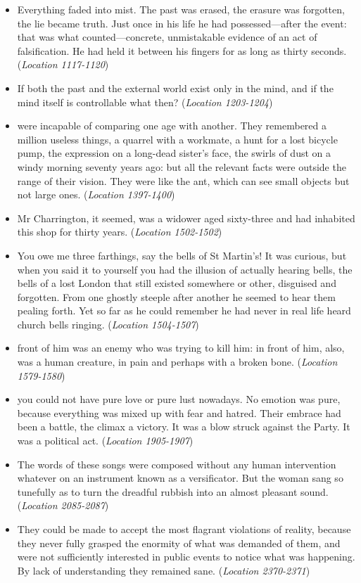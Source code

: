 \documentclass[12pt]{article}
\begin{document}
\begin{itemize}
\item {Everything faded into mist. The past was erased, the erasure was forgotten, the lie became truth. Just once in his life he had possessed—after the event: that was what counted—concrete, unmistakable evidence of an act of falsification. He had held it between his fingers for as long as thirty seconds. (\textit{Location 1117-1120})}
\item {If both the past and the external world exist only in the mind, and if the mind itself is controllable what then? (\textit{Location 1203-1204})}
\item {were incapable of comparing one age with another. They remembered a million useless things, a quarrel with a workmate, a hunt for a lost bicycle pump, the expression on a long-dead sister’s face, the swirls of dust on a windy morning seventy years ago: but all the relevant facts were outside the range of their vision. They were like the ant, which can see small objects but not large ones. (\textit{Location 1397-1400})}
\item {Mr Charrington, it seemed, was a widower aged sixty-three and had inhabited this shop for thirty years. (\textit{Location 1502-1502})}
\item {You owe me three farthings, say the bells of St Martin’s! It was curious, but when you said it to yourself you had the illusion of actually hearing bells, the bells of a lost London that still existed somewhere or other, disguised and forgotten. From one ghostly steeple after another he seemed to hear them pealing forth. Yet so far as he could remember he had never in real life heard church bells ringing. (\textit{Location 1504-1507})}
\item {front of him was an enemy who was trying to kill him: in front of him, also, was a human creature, in pain and perhaps with a broken bone. (\textit{Location 1579-1580})}
\item {you could not have pure love or pure lust nowadays. No emotion was pure, because everything was mixed up with fear and hatred. Their embrace had been a battle, the climax a victory. It was a blow struck against the Party. It was a political act. (\textit{Location 1905-1907})}
\item {The words of these songs were composed without any human intervention whatever on an instrument known as a versificator. But the woman sang so tunefully as to turn the dreadful rubbish into an almost pleasant sound. (\textit{Location 2085-2087})}
\item {They could be made to accept the most flagrant violations of reality, because they never fully grasped the enormity of what was demanded of them, and were not sufficiently interested in public events to notice what was happening. By lack of understanding they remained sane. (\textit{Location 2370-2371})}

\end{itemize}
\end{document}
